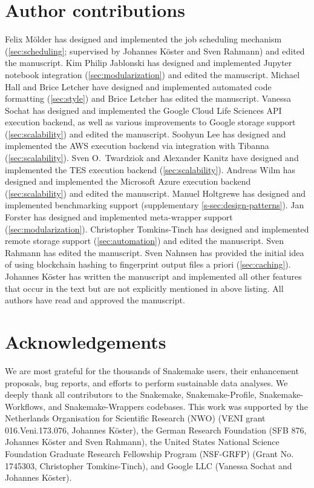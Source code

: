 \documentclass[parskip=half, DIV=18]{scrartcl}
\begin{document}
\section{Author contributions}
Felix Mölder has designed and implemented the job scheduling mechanism (\autoref{sec:scheduling}; supervised by Johannes Köster and Sven Rahmann) and edited the manuscript.
Kim Philip Jablonski has designed and implemented Jupyter notebook integration (\autoref{sec:modularization}) and edited the manuscript.
Michael Hall and Brice Letcher have designed and implemented automated code formatting (\autoref{sec:style}) and Brice Letcher has edited the manuscript.
Vanessa Sochat has designed and implemented the Google Cloud Life Sciences API execution backend, as well as various improvements to Google storage support (\autoref{sec:scalability}) and edited the manuscript.
Soohyun Lee has designed and implemented the AWS execution backend via integration with Tibanna (\autoref{sec:scalability}).
Sven O.\ Twardziok and Alexander Kanitz have designed and implemented the TES execution backend (\autoref{sec:scalability}).
Andreas Wilm has designed and implemented the Microsoft Azure execution backend (\autoref{sec:scalability}) and edited the manuscript.
Manuel Holtgrewe has designed and implemented benchmarking support (supplementary \autoref{s-sec:design-patterns}).
Jan Forster has designed and implemented meta-wrapper support (\autoref{sec:modularization}).
Christopher Tomkins-Tinch has designed and implemented remote storage support (\autoref{sec:automation}) and edited the manuscript.
Sven Rahmann has edited the manuscript.
Sven Nahnsen has provided the initial idea of using blockchain hashing to fingerprint output files a priori (\autoref{sec:caching}).
Johannes Köster has written the manuscript and implemented all other features that occur in the text but are not explicitly mentioned in above listing.
All authors have read and approved the manuscript.

\section{Acknowledgements}
We are most grateful for the thousands of Snakemake users, their enhancement proposals, bug reports, and efforts to perform sustainable data analyses.
We deeply thank all contributors to the Snakemake, Snakemake-Profile, Snakemake-Workflows, and Snakemake-Wrappers codebases.
This work was supported by the Netherlands Organisation for Scientific Research (NWO) (VENI grant 016.Veni.173.076, Johannes Köster), the German Research Foundation (SFB 876, Johannes Köster and Sven Rahmann), the United States National Science Foundation Graduate Research Fellowship Program (NSF-GRFP) (Grant No. 1745303, Christopher Tomkins-Tinch), and Google LLC (Vanessa Sochat and Johannes Köster).

\printbibliography
\end{document}
